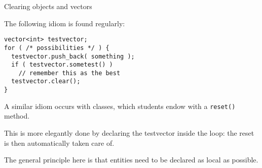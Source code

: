  {Clearing objects and vectors}
\label{teach:clear}

The following idiom is found regularly:
\begin{lstlisting}
vector<int> testvector;
for ( /* possibilities */ ) {
  testvector.push_back( something );
  if ( testvector.sometest() ) 
    // remember this as the best
  testvector.clear();
}
\end{lstlisting}
A similar idiom occurs with classes,
which students endow with a \lstinline+reset()+ method.

This is more elegantly done by declaring the testvector inside the loop:
the reset is then automatically taken care of.

The general principle here is that entities need to be declared as
local as possible.
